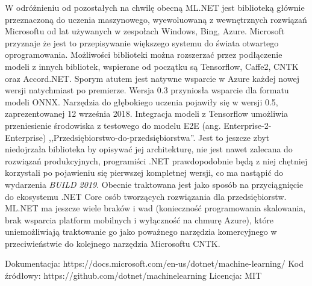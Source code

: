 \documentclass[12pt,a4paper,twoside,titlepage,openright]{book}
\begin{document}
W odróżnieniu od pozostałych na chwilę obecną ML.NET jest biblioteką głównie przeznaczoną do uczenia maszynowego, wyewoluowaną z wewnętrznych rozwiązań Microsoftu od lat używanych w zespołach Windows, Bing, Azure. Microsoft przyznaje że jest to przepisywanie większego systemu do świata otwartego oprogramowania. \cite{siteMLNet} Możliwości biblioteki można rozszerzać przez podłączenie modeli z innych bibliotek, wspierane od początku są Tensorflow, Caffe2, CNTK oraz Accord.NET. Sporym atutem jest natywne wsparcie w Azure każdej nowej wersji natychmiast po premierze. Wersja 0.3 przyniosła wsparcie dla formatu modeli ONNX. Narzędzia do głębokiego uczenia pojawiły się w wersji 0.5, zaprezentowanej 12 września 2018. Integracja modeli z Tensorflow umożliwia przeniesienie środowiska z testowego do modelu E2E (ang. Enterprise-2-Enterprise) ,,Przedsiębiorstwo-do-przedsiębiorstwa''. Jest to jeszcze zbyt niedojrzała biblioteka by opisywać jej architekturę, nie jest nawet zalecana do rozwiązań produkcyjnych, programiści .NET prawdopodobnie będą z niej chętniej korzystali po pojawieniu się pierwszej kompletnej wersji, co ma nastąpić do wydarzenia \textit{BUILD 2019}. Obecnie traktowana jest jako sposób na przyciągnięcie do ekosystemu .NET Core osób tworzących rozwiązania dla przedsiębiorstw. ML.NET ma jeszcze wiele braków i wad (konieczność programowania skalowania, brak wsparcia platform mobilnych i wyłączność na chmurę Azure), które uniemożliwiają traktowanie go jako poważnego narzędzia komercyjnego w przeciwieństwie do kolejnego narzędzia Microsoftu CNTK.

\noindent
\newline
Dokumentacja: https://docs.microsoft.com/en-us/dotnet/machine-learning/
\newline
Kod źródłowy: https://github.com/dotnet/machinelearning
\newline
Licencja: MIT
\end{document}
